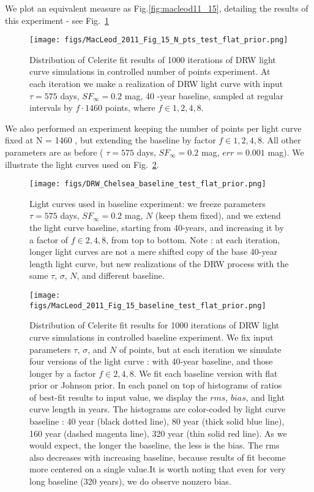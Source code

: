 \documentclass[fleqn,usenatbib]{mnras}  %
\begin{document}
We plot an equivalent measure as Fig.\ref{fig:macleod11_15}, detailing the results of this experiment - see Fig.~\ref{fig:macleod11_15_Npts}




\begin{figure}
\texttt{[image: figs/MacLeod\_2011\_Fig\_15\_N\_pts\_test\_flat\_prior.png]}
\caption{Distribution of Celerite fit results of 1000 iterations of DRW light curve simulations in controlled number of points experiment. At  each iteration we make a realization of DRW light curve with input $\tau=575$ days, $SF_{\infty}=0.2$ mag, 40 -year baseline, sampled at regular intervals by $f \cdot 1460 $ points,  where $f \in {1,2,4,8}$.}
\label{fig:macleod11_15_Npts}
\end{figure}


We also performed an experiment keeping the number of points per light curve fixed at N = 1460 , but extending the baseline by factor $f \in {1,2,4,8}$. All other parameters are as before ( $\tau = 575$ days, $SF_{\infty} = 0.2$ mag, $err = 0.001$ mag). We illustrate the light curves used on Fig.~\ref{fig:lc_length}.

\begin{figure}
\texttt{[image: figs/DRW\_Chelsea\_baseline\_test\_flat\_prior.png]}
\caption{Light curves used in baseline experiment: we freeze parameters   $\tau=575 $ days, $SF_{\infty}=0.2$ mag, $N$ (keep them fixed), and we extend the light curve baseline, starting from 40-years, and increasing it by a factor of $f \in {2,4,8}$, from top to bottom. Note : at each iteration, longer light curves are not a mere shifted copy of the base 40-year length light curve, but new realizations of the DRW process with the same $\tau$, $\sigma$, $N$, and different baseline.}
\label{fig:lc_length}
\end{figure}

% 

\begin{figure}
\texttt{[image: figs/MacLeod\_2011\_Fig\_15\_baseline\_test\_flat\_prior.png]}
\caption{Distribution of Celerite fit results for 1000 iterations of DRW light curve simulations in controlled baseline experiment.  We fix input parameters $\tau$, $\sigma$, and $N$ of points,  but at each iteration we simulate four versions of the light curve  : with 40-year baseline, and those longer by a factor $f \in {2,4,8}$. We fit each baseline version with flat prior or Johnson prior. In each panel  on top of histograms of ratios of best-fit results to input value, we display the $rms$, $bias$, and light curve length in years. The histograms are color-coded by light curve baseline : 40 year (black dotted line), 80 year (thick solid blue line), 160 year (dashed magenta line), 320 year (thin solid red line). As we would expect, the longer the baseline, the less is the bias. The rms also decreases with increasing baseline, because results of fit become more centered on a single value.It is worth noting that even for very long baseline (320 years), we do observe nonzero bias.  }
\label{fig:macleod11_15_baseline}
\end{figure}
\end{document}
